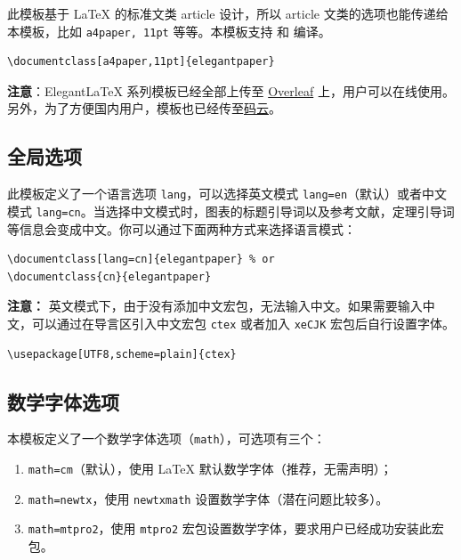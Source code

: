 \documentclass[lang=cn,11pt,a4paper,cite=authoryear]{elegantpaper}
\begin{document}
此模板基于 \LaTeX{} 的标准文类 article 设计，所以 article 文类的选项也能传递给本模板，比如 \lstinline{a4paper, 11pt} 等等。本模板支持  和  编译。

\begin{lstlisting}
\documentclass[a4paper,11pt]{elegantpaper}
\end{lstlisting}

\textbf{注意}：Elegant\LaTeX{} 系列模板已经全部上传至 \href{https://www.overleaf.com/latex/templates/elegantpaper-template/yzghrqjhmmmr}{Overleaf} 上，用户可以在线使用。另外，为了方便国内用户，模板也已经传至\href{https://gitee.com/ElegantLaTeX/ElegantPaper}{码云}。


\subsection{全局选项}
此模板定义了一个语言选项 \lstinline{lang}，可以选择英文模式 \lstinline{lang=en}（默认）或者中文模式 \lstinline{lang=cn}。当选择中文模式时，图表的标题引导词以及参考文献，定理引导词等信息会变成中文。你可以通过下面两种方式来选择语言模式：
\begin{lstlisting}
\documentclass[lang=cn]{elegantpaper} % or
\documentclass{cn}{elegantpaper} 
\end{lstlisting}

\textbf{注意：} 英文模式下，由于没有添加中文宏包，无法输入中文。如果需要输入中文，可以通过在导言区引入中文宏包 \lstinline{ctex} 或者加入 \lstinline{xeCJK} 宏包后自行设置字体。 
\begin{lstlisting}
\usepackage[UTF8,scheme=plain]{ctex}
\end{lstlisting}

\subsection{数学字体选项}

本模板定义了一个数学字体选项（\lstinline{math}），可选项有三个：
\begin{enumerate}
  \item \lstinline{math=cm}（默认），使用 \LaTeX{} 默认数学字体（推荐，无需声明）；
  \item \lstinline{math=newtx}，使用 \lstinline{newtxmath} 设置数学字体（潜在问题比较多）。
  \item \lstinline{math=mtpro2}，使用 \lstinline{mtpro2} 宏包设置数学字体，要求用户已经成功安装此宏包。
\end{enumerate}
\end{document}
